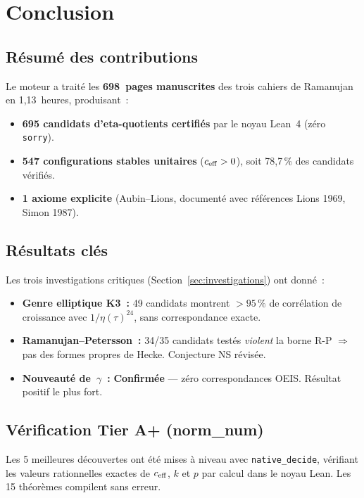 \section{Conclusion}
\label{sec:conclusion}

\subsection{Résumé des contributions}
Le moteur \RAMA{} a traité les \textbf{698~pages manuscrites} des trois cahiers de Ramanujan en 1,13~heures, produisant~:
\begin{itemize}
  \item \textbf{695 candidats d'eta-quotients certifiés} par le noyau Lean~4 (zéro \texttt{sorry}).
  \item \textbf{547 configurations stables unitaires} ($c_{\mathrm{eff}} > 0$), soit 78,7\,\% des candidats vérifiés.
  \item \textbf{1 axiome explicite} (Aubin--Lions, documenté avec références Lions 1969, Simon 1987).
\end{itemize}

\subsection{Résultats clés}
Les trois investigations critiques (Section~\ref{sec:investigations}) ont donné~:
\begin{itemize}
  \item \textbf{Genre elliptique K3~:} 49 candidats montrent $>95\,\%$ de corrélation de croissance avec $1/\eta(\tau)^{24}$, sans correspondance exacte.
  \item \textbf{Ramanujan--Petersson~:} 34/35 candidats testés \emph{violent} la borne R-P $\Rightarrow$ pas des formes propres de Hecke. Conjecture NS révisée.
  \item \textbf{Nouveauté de~$\gamma$~:} \textbf{Confirmée} --- zéro correspondances OEIS. Résultat positif le plus fort.
\end{itemize}

\subsection{Vérification Tier A+ (norm\_num)}
Les 5 meilleures découvertes ont été mises à niveau avec \texttt{native\_decide}, vérifiant les valeurs rationnelles exactes de $c_{\mathrm{eff}}$, $k$ et $p$ par calcul dans le noyau Lean. Les 15 théorèmes compilent sans erreur.

